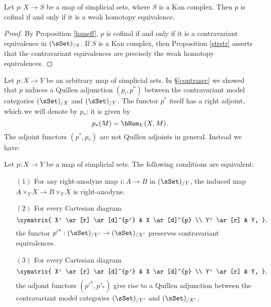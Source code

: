 \begin{corollary}\label{weakcont}
Let $p: X \rightarrow S$ be a map of simplicial sets, where $S$ is a Kan complex. Then
$p$ is cofinal if and only if it is a weak homotopy equivalence.
\end{corollary}

\begin{proof}
By Proposition \ref{huneff}, $p$ is cofinal if and only if it is a contravariant equivalence
in $(\sSet)_{/S}$. If $S$ is a Kan complex, then Proposition \ref{strstr} asserts that
the contravariant equivalences are precisely the weak homotopy equivalences.
\end{proof}

Let $p: X \rightarrow Y$ be an arbitrary map of simplicial sets. In \S \ref{contrasec} we showed that $p$ induces a Quillen adjunction $(p_{!}, p^{\ast})$ between the contravariant model categories
$(\sSet)_{/X}$ and $(\sSet)_{/Y}$. The functor $p^{\ast}$ itself has a right adjoint, which we will denote by $p_{\ast}$; it is given by
$$ p_{\ast}(M) =  \bHom_{Y}(X,M).$$
The adjoint functors $(p^{\ast}, p_{\ast})$ are not Quillen adjoints in general. Instead we have:

\begin{proposition}\label{smoothdef}
Let $p: X \rightarrow Y$ be a map of simplicial sets. The following conditions are equivalent:

\begin{itemize}
\item[$(1)$] For any right-anodyne map $i: A \rightarrow B$ in $(\sSet)_{/Y}$, the induced map
$A \times_Y X \rightarrow B \times_{Y} X$ is right-anodyne.

\item[$(2)$] For every Cartesian diagram
$$\xymatrix{ X' \ar[r] \ar[d]^{p'} & X \ar[d]^{p} \\
Y' \ar[r] & Y, },$$ the functor ${p'}^{\ast}: (\sSet)_{/Y'} \rightarrow (\sSet)_{/X'}$ preserves contravariant equivalences. 

\item[$(3)$] For every Cartesian diagram
$$\xymatrix{ X' \ar[r] \ar[d]^{p'} & X \ar[d]^{p} \\
Y' \ar[r] & Y, },$$ the adjoint functors $( {p'}^{\ast}, p'_{\ast})$ give rise to a Quillen adjunction between the contravariant model categories $(\sSet)_{/Y'}$ and $(\sSet)_{/X'}$. 
\end{itemize}

\end{proposition}

